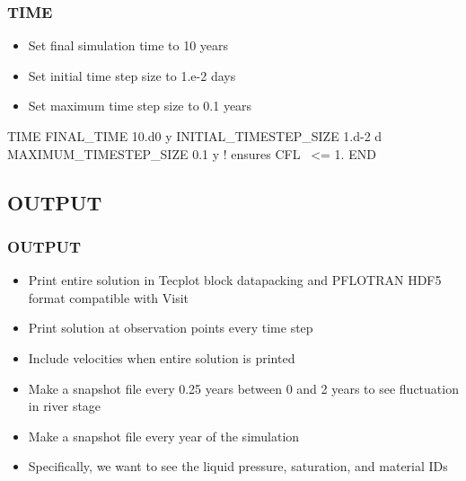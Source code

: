 \documentclass{beamer}
\newcommand\bluecomment[1]{{{\color{blue} #1}}}
\begin{document}
\begin{frame}[fragile]\frametitle{TIME}

\begin{itemize}
\item Set final simulation time to 10 years
\item Set initial time step size to 1.e-2 days
\item Set maximum time step size to 0.1 years
\end{itemize}


\begin{semiverbatim}

TIME
  FINAL_TIME 10.d0 y
  INITIAL_TIMESTEP_SIZE 1.d-2 d
  MAXIMUM_TIMESTEP_SIZE 0.1 y    \bluecomment{! ensures CFL ~<= 1.}
END
\end{semiverbatim}

\end{frame}

\subsection{OUTPUT}

\begin{frame}[fragile]\frametitle{OUTPUT}

\begin{itemize}
\item Print entire solution in Tecplot block datapacking and PFLOTRAN HDF5 format compatible with Visit
\item Print solution at observation points every time step
\item Include velocities when entire solution is printed
\item Make a snapshot file every 0.25 years between 0 and 2 years to see fluctuation in river stage
\item Make a snapshot file every year of the simulation
\item Specifically, we want to see the liquid pressure, saturation, and material IDs
\end{itemize}

\end{frame}
\end{document}
